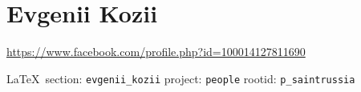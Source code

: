  
 
\section{Evgenii Kozii}
\url{https://www.facebook.com/profile.php?id=100014127811690}
  
\vspace{0.5cm}
 {\ifDEBUG\small\LaTeX~section: \verb|evgenii_kozii| project: \verb|people| rootid: \verb|p_saintrussia|	\fi}
\vspace{0.5cm}

